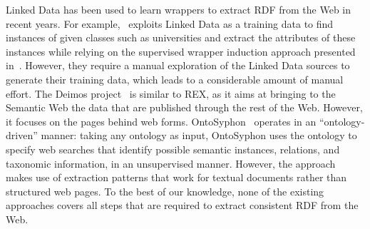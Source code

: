 \documentclass{llncs}
\begin{document}

Linked Data has been used to learn wrappers to extract RDF from the Web in recent years. 
For example,~\cite{Gentile2013} exploits Linked Data as a training data to find instances of given classes such as universities and extract the attributes of these instances while relying on the supervised wrapper induction approach presented in~\cite{Hao2011}. However, they require a manual exploration of the Linked Data sources to generate their training data, which leads to a considerable amount of manual effort.
%
The {\sc Deimos} project~\cite{conf/aaaiss/ParundekarKA10} is similar to REX, as it aims at bringing to the Semantic Web the data that are published through the rest of the Web. 
However, it focuses on the pages behind web forms.
%
%
OntoSyphon~\cite{DBLP:journals/ws/McDowellC08} operates in an ``ontology-driven'' manner: taking any ontology as input, OntoSyphon uses the ontology to specify web searches that identify possible semantic instances, relations, and taxonomic information, in an unsupervised manner. However, the approach makes use of extraction patterns that work for textual documents rather than structured web pages. %
To the best of our knowledge, none of the existing approaches covers all steps that are required to extract consistent RDF from the Web. 
\end{document}
